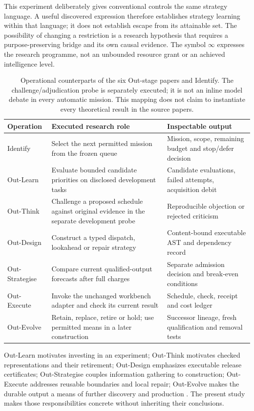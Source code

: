 This experiment deliberately gives conventional controls the same strategy language. A useful discovered expression therefore establishes strategy learning within that language; it does not establish escape from its attainable set. The possibility of changing a restriction is a research hypothesis that requires a purpose-preserving bridge and its own causal evidence. The symbol $\infty$ expresses the research programme, not an unbounded resource grant or an achieved intelligence level.

\begin{table}[ht]\centering\small
\begin{tabularx}{\linewidth}{L{25mm}YY}
\toprule
Operation & Executed research role & Inspectable output \\
\midrule
Identify & Select the next permitted mission from the frozen queue & Mission, scope, remaining budget and stop/defer decision \\
Out-Learn & Evaluate bounded candidate priorities on disclosed development tasks & Candidate evaluations, failed attempts, acquisition debit \\
Out-Think & Challenge a proposed schedule against original evidence in the separate development probe & Reproducible objection or rejected criticism \\
Out-Design & Construct a typed dispatch, lookahead or repair strategy & Content-bound executable AST and dependency record \\
Out-Strategise & Compare current qualified-output forecasts after full charges & Separate admission decision and break-even conditions \\
Out-Execute & Invoke the unchanged workbench adapter and check its current result & Schedule, check, receipt and cost ledger \\
Out-Evolve & Retain, replace, retire or hold; use permitted means in a later construction & Successor lineage, fresh qualification and removal tests \\
\bottomrule
\end{tabularx}
\caption{Operational counterparts of the six Out-stage papers and Identify. The challenge/adjudication probe is separately executed; it is not an inline model debate in every automatic mission. This mapping does not claim to instantiate every theoretical result in the source papers.}
\end{table}

Out-Learn motivates investing in an experiment; Out-Think motivates checked representations and their retirement; Out-Design emphasizes executable release certificates; Out-Strategise couples information gathering to construction; Out-Execute addresses reusable boundaries and local repair; Out-Evolve makes the durable output a means of further discovery and production \citep{boucher2026outlearn,boucher2026outthink,boucher2026outdesign,boucher2026outstrategise,boucher2026outexecute,boucher2026outevolve}. The present study makes those responsibilities concrete without inheriting their conclusions.
